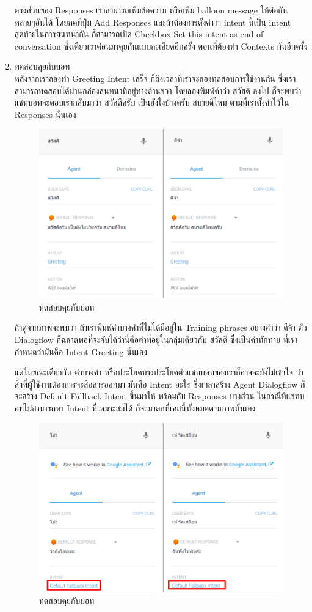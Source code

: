 \begin{enumerate}
	ตรงส่วนของ Responses เราสามารถเพิ่มข้อความ หรือเพิ่ม balloon message ให้ต่อกันหลายๆอันได้ โดยกดที่ปุ่ม Add Responses และถ้าต้องการตั้งค่าว่า intent นี้เป็น intent สุดท้ายในการสนทนากัน ก็สามารถเปิด Checkbox Set this intent as end of conversation ซึ่งเดียวเราค่อนมาคุยกันแบบละเอียดอีกครั้ง ตอนที่ต้องทำ Contexts กันอีกครั้ง

	\item ทดสอบคุยกับบอท \\
	หลังจากเราลองทำ Greeting Intent เสร็จ ก็ถึงเวลาที่เราจะลองทดสอบการใช้งานกัน ซึ่งเราสามารถทดสอบได้ผ่านกล่องสนทนาที่อยู่ทางด้านขวา โดยลองพิมพ์คำว่า สวัสดี ลงไป ก็จะพบว่าแชทบอทจะตอบเรากลับมาว่า สวัสดีครับ เป็นยังไงบ้างครับ สบายดีไหม ตามที่เราตั้งค่าไว้ใน Responses นั้นเอง

	\begin{figure}[H]
		\centering
		\includegraphics[width=0.7\columnwidth]{Figures/2/dialogflow_5}
		\caption{ทดสอบคุยกับบอท}
		\label{Fig:f1}
	\end{figure}

	ถ้าดูจากภาพจะพบว่า ถ้าเราพิมพ์คำบางคำที่ไม่ได้มีอยู่ใน Training phrases อย่างคำว่า ดีจ้า ตัว Dialogflow ก็ฉลาดพอที่จะจับได้ว่านี่คือคำที่อยู่ในกลุ่มเดียวกับ สวัสดี ซึ่งเป็นคำทักทาย ที่เรากำหนดว่ามันคือ Intent Greeting นั้นเอง

	แต่ในขณะเดียวกัน คำบางคำ หรือประโยคบางประโยคตัวแชทบอทของเราก็อาจจะยังไม่เข้าใจ ว่าสิ่งที่ผู้ใช้งานต้องการจะสื่อสารออกมา มันคือ Intent อะไร ซึ่งเวลาสร้าง Agent Dialogflow ก็จะสร้าง Default Fallback Intent ขึ้นมาให้ พร้อมกับ Responses บางส่วน ในกรณีที่แชทบอทไม่สามารถหา Intent ที่เหมาะสมได้ ก็จะมาตกที่เคสนี้ทั้งหมดตามภาพนั้นเอง

	\begin{figure}[H]
		\centering
		\includegraphics[width=0.7\columnwidth]{Figures/2/dialogflow_6}
		\caption{ทดสอบคุยกับบอท}
		\label{Fig:f1}
	\end{figure}
\end{enumerate}

